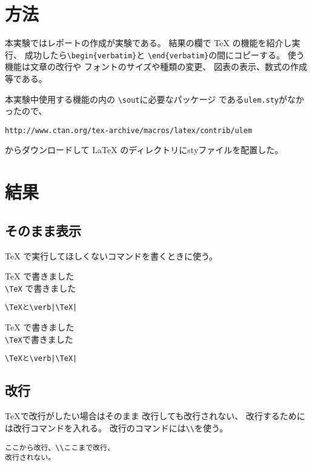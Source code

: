 \documentclass{jsarticle}
\begin{document}
\section{方法}
本実験ではレポートの作成が実験である。
結果の欄で
\TeX
の機能を紹介し実行、
成功したら\verb|\begin{verbatim}|と
\verb|\end{verbatim}|の間にコピーする。
使う機能は文章の改行や
フォントのサイズや種類の変更、
図表の表示、数式の作成等である。\par
本実験中使用する機能の内の
\verb|\sout|に必要なパッケージ
である\verb|ulem.sty|がなかったので、\\
\begin{center}
\verb|http://www.ctan.org/tex-archive/macros/latex/contrib/ulem|\\
\end{center}
からダウンロードして
\LaTeX
のディレクトリにstyファイルを配置した。

\section{結果}
\subsection{そのまま表示}
\TeX
で実行してほしくないコマンドを書くときに使う。

\begin{verbatim*}
\TeX
で書きました\\
\verb|\TeX|
で書きました
\begin{verbatim}
\TeXと\verb|\TeX|
\end{verbatim}
\end{verbatim*}

\noindent
\TeX
で書きました\\
\verb|\TeX|で書きました
\begin{verbatim}
\TeXと\verb|\TeX|
\end{verbatim}


\subsection{改行}

TeXで改行がしたい場合はそのまま
改行しても改行されない、
改行するためには改行コマンドを入れる。
改行のコマンドには\verb|\\|を使う。

\begin{verbatim}
ここから改行、\\ここまで改行、
改行されない。
\end{verbatim}
\end{document}
